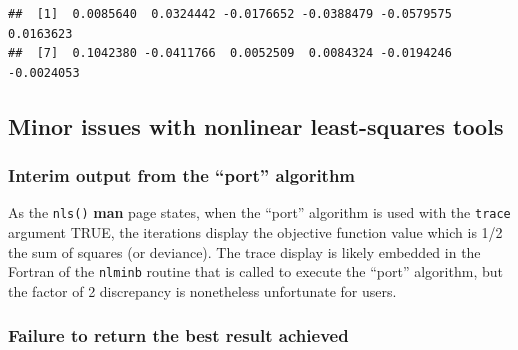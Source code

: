 \documentclass[
]{article}
\newenvironment{Shaded}{\begin{snugshade}}{\end{snugshade}}
\newcommand{\AttributeTok}[1]{\textcolor[rgb]{0.77,0.63,0.00}{#1}}
\newcommand{\ConstantTok}[1]{\textcolor[rgb]{0.00,0.00,0.00}{#1}}
\newcommand{\FunctionTok}[1]{\textcolor[rgb]{0.00,0.00,0.00}{#1}}
\newcommand{\NormalTok}[1]{#1}
\newcommand{\OtherTok}[1]{\textcolor[rgb]{0.56,0.35,0.01}{#1}}
\newcommand{\SpecialCharTok}[1]{\textcolor[rgb]{0.00,0.00,0.00}{#1}}
\newcommand{\StringTok}[1]{\textcolor[rgb]{0.31,0.60,0.02}{#1}}
\begin{document}
\begin{Shaded}
\end{Shaded}

\begin{verbatim}
##  [1]  0.0085640  0.0324442 -0.0176652 -0.0388479 -0.0579575  0.0163623
##  [7]  0.1042380 -0.0411766  0.0052509  0.0084324 -0.0194246 -0.0024053
\end{verbatim}

\hypertarget{minor-issues-with-nonlinear-least-squares-tools}{%
\subsection{Minor issues with nonlinear least-squares
tools}\label{minor-issues-with-nonlinear-least-squares-tools}}

\hypertarget{interim-output-from-the-port-algorithm}{%
\subsubsection{Interim output from the ``port''
algorithm}\label{interim-output-from-the-port-algorithm}}

As the \texttt{nls()} \textbf{man} page states, when the ``port''
algorithm is used with the \texttt{trace} argument TRUE, the iterations
display the objective function value which is 1/2 the sum of squares (or
deviance). The trace display is likely embedded in the Fortran of the
\texttt{nlminb} routine that is called to execute the ``port''
algorithm, but the factor of 2 discrepancy is nonetheless unfortunate
for users.

\hypertarget{failure-to-return-the-best-result-achieved}{%
\subsubsection{Failure to return the best result
achieved}\label{failure-to-return-the-best-result-achieved}}
\end{document}
